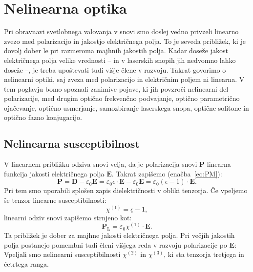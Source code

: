 \chapter{Nelinearna optika}
\label{chap:NLO}
Pri obravnavi svetlobnega valovanja v snovi smo doslej vedno privzeli linearno 
zvezo med polarizacijo in jakostjo električnega polja. To 
je seveda približek, ki je dovolj dober le pri razmeroma majhnih jakostih
polja. Kadar doseže jakost električnega polja velike vrednosti -- in v laserskih snopih
jih nedvomno lahko doseže --, je treba upoštevati tudi višje člene v razvoju. Takrat
govorimo o nelinearni optiki, saj zveza med polarizacijo
in električnim poljem ni linearna. V tem poglavju bomo spoznali zanimive pojave, ki jih 
povzroči nelinearni del polarizacije, med drugim optično 
frekvenčno podvajanje, optično parametrično ojačevanje, optično usmerjanje, 
samozbiranje laserskega snopa, optične solitone in optično fazno konjugacijo. 

\section{Nelinearna susceptibilnost}
\label{Chap:Chi}
V linearnem približku odziva snovi velja, da je polarizacija snovi 
$\mathbf{P}$ linearna funkcija jakosti električnega polja 
$\mathbf{E}$. Takrat zapišemo (enačba~\ref{eq:PM}):
\begin{equation}
\mathbf{P} = \mathbf{D} - \varepsilon_0 \mathbf{E} = 
\varepsilon_0 \underline{\epsilon} \cdot\mathbf{E} - \varepsilon_0 \mathbf{E} = 
\varepsilon_0 (\underline{\epsilon} - 1)\cdot\mathbf{E}. 
\end{equation}
Pri tem smo uporabili splošen zapis dielektričnosti v obliki tenzorja. Če vpeljemo še tenzor linearne susceptibilnosti:
\begin{equation}
\chi^{(1)} = \underline{\epsilon} - 1,
\end{equation}
linearni odziv snovi zapišemo strnjeno kot:
\begin{equation}
\mathbf{P}_{\mathrm{L}} =  \varepsilon_0 \chi^{(1)} \cdot \mathbf{E}.
\end{equation}
Ta približek je dober za majhne jakosti električnega polja. Pri večjih jakostih polja
postanejo pomembni tudi členi višjega reda v razvoju polarizacije
po $\mathbf{E}$:
Vpeljali smo nelinearni susceptibilnosti 
$\chi^{(2)}$ in $\chi^{(3)}$, ki sta tenzorja tretjega in četrtega ranga.


